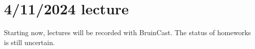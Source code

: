\documentclass[class=article, crop=false]{standalone}
\begin{document}
\section{4/11/2024 lecture}
Starting now, lectures will be recorded with BruinCast. The status of homeworks is still uncertain.
\par
{}
\end{document}
